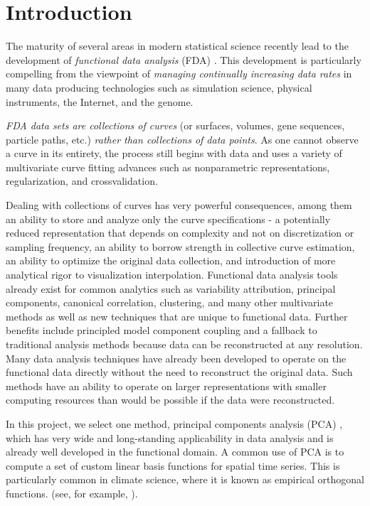 \newcommand{\cA}{\mathcal{A}} %
\newcommand{\R}{\mathbb{R}} %
\newcommand{\cD}{\mathcal{D}} %
\newcommand{\cC}{\mathcal{C}} %
\newcommand{\Xs}{X^*} %
\newcommand{\cN}{\mathcal{N}} %


\section{Introduction}
\label{sec:intro}
The maturity of several areas in modern statistical science recently
lead to the development of {\em functional data analysis} (FDA)
\cite{Ramsey2005,Ferraty2006,Ramsey2009,Hsing2015}. This development
is particularly compelling from the viewpoint of {\em managing
  continually increasing data rates} in many data producing
technologies such as simulation science, physical instruments, the
Internet, and the genome.

{\em FDA data sets are collections of curves} (or surfaces, volumes,
gene sequences, particle paths, etc.) {\em rather than collections of
  data points}. As one cannot observe a curve in its entirety, the
process still begins with data and uses a variety of multivariate
curve fitting advances such as nonparametric representations,
regularization, and crossvalidation. 

Dealing with collections of curves has very powerful consequences,
among them an ability to store and analyze only the curve
specifications - a potentially reduced representation that depends on
complexity and not on discretization or sampling frequency, an ability
to borrow strength in collective curve estimation, an ability to
optimize the original data collection, and introduction of more
analytical rigor to visualization interpolation.  Functional data
analysis tools already exist for common analytics such as variability
attribution, principal components, canonical correlation, clustering,
and many other multivariate methods as well as new techniques that are
unique to functional data. Further benefits include principled model
component coupling and a fallback to traditional analysis methods
because data can be reconstructed at any resolution. Many data
analysis techniques have already been developed to operate on the
functional data directly without the need to reconstruct the original
data. Such methods have an ability to operate on larger
representations with smaller computing resources than would be
possible if the data were reconstructed.

In this project, we select one method, principal components analysis
(PCA) \cite{Jolliffe2002}, which has very wide and long-standing
applicability in data analysis and is already well developed in the
functional domain. A common use of PCA is to compute a set of custom
linear basis functions for spatial time series. This is particularly
common in climate science, where it is known as empirical orthogonal
functions.  (see, for example, \cite{JOC2007}).


